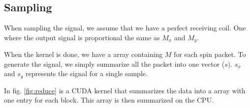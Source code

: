 






\subsection{Sampling}

When sampling the signal, we assume that we have a perfect receiving
coil. One where the output signal is proportional the same as $M_x$
and $M_y$.

When the kernel is done, we have a array containing $M$ for each spin
packet. To generate the signal, we simply summarize all the packet
into one vector ($s$). $s_x$ and $s_y$ represents the signal for a
single sample.

In fig. \ref{fig:reduce} is a CUDA kernel that summarizes the data into a array with one
entry for each block. This array is then summarized on the CPU.

